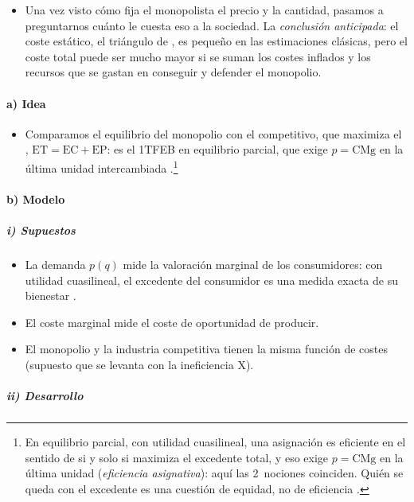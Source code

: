 \documentclass[11pt]{article}
\begin{document}
\begin{itemize}
\item Una vez visto cómo fija el monopolista el precio y la cantidad, pasamos a preguntarnos cuánto le cuesta eso a la sociedad. La \emph{conclusión anticipada}: el coste estático, el triángulo de , es pequeño en las estimaciones clásicas, pero el coste total puede ser mucho mayor si se suman los costes inflados y los recursos que se gastan en conseguir y defender el monopolio.
\end{itemize}

\paragraph{a) Idea}

\begin{itemize}
\item Comparamos el equilibrio del monopolio con el competitivo, que maximiza el , $\mathrm{ET}=\mathrm{EC}+\mathrm{EP}$: es el 1TFEB en equilibrio parcial, que exige $p=\mathrm{CMg}$ en la última unidad intercambiada  .\footnote{En equilibrio parcial, con utilidad cuasilineal, una asignación es eficiente en el sentido de  si y solo si maximiza el excedente total, y eso exige $p=\mathrm{CMg}$ en la última unidad (\emph{eficiencia asignativa}): aquí las 2~nociones coinciden. Quién se queda con el excedente es una cuestión de equidad, no de eficiencia .}
\end{itemize}

\paragraph{b) Modelo}

\subparagraph{i) Supuestos}

\begin{itemize}
\item La demanda $p(q)$ mide la valoración marginal de los consumidores: con utilidad cuasilineal, el excedente del consumidor es una medida exacta de su bienestar .
\item El coste marginal mide el coste de oportunidad de producir.
\item El monopolio y la industria competitiva tienen la misma función de costes (supuesto que se levanta con la ineficiencia X).
\end{itemize}

\subparagraph{ii) Desarrollo}
\end{document}
